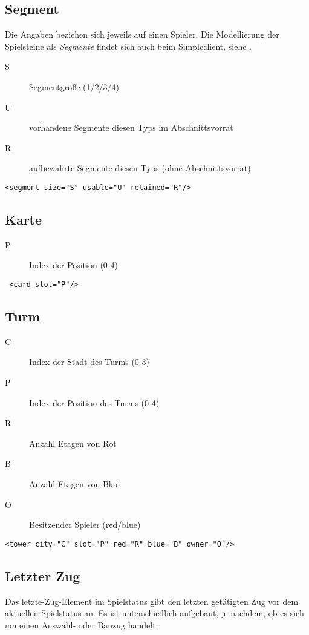 \documentclass[12pt,a4paper, german, oneside]{scrartcl}
\begin{document}
\subsection{\label{segment}Segment}
Die Angaben beziehen sich jeweils auf einen Spieler. Die Modellierung der Spielsteine als \textit{Segmente} findet sich auch beim Simpleclient, siehe .
\begin{description}
\item[S] Segmentgröße (1/2/3/4)
\item[U] vorhandene Segmente diesen Typs im Abschnittsvorrat
\item[R] aufbewahrte Segmente diesen Typs (ohne Abschnittsvorrat)
\end{description}
\begin{verbatim}<segment size="S" usable="U" retained="R"/>
\end{verbatim}


\subsection{\label{card}Karte}
\begin{description}
\item[P] Index der Position (0-4)
\end{description}
\begin{verbatim} <card slot="P"/>
\end{verbatim}


\subsection{\label{tower}Turm}
\begin{description}
\item[C] Index der Stadt des Turms (0-3)
\item[P] Index der Position des Turms (0-4)
\item[R] Anzahl Etagen von Rot
\item[B] Anzahl Etagen von Blau
\item[O] Besitzender Spieler (red/blue)

\end{description}
\begin{verbatim}<tower city="C" slot="P" red="R" blue="B" owner="O"/>
\end{verbatim}


\subsection{\label{lastmove}Letzter Zug}
 Das letzte-Zug-Element im Spielstatus gibt den letzten getätigten Zug vor dem aktuellen Spielstatus an. Es ist unterschiedlich aufgebaut, je nachdem, ob es sich um einen Auswahl- oder Bauzug handelt:
\end{document}
